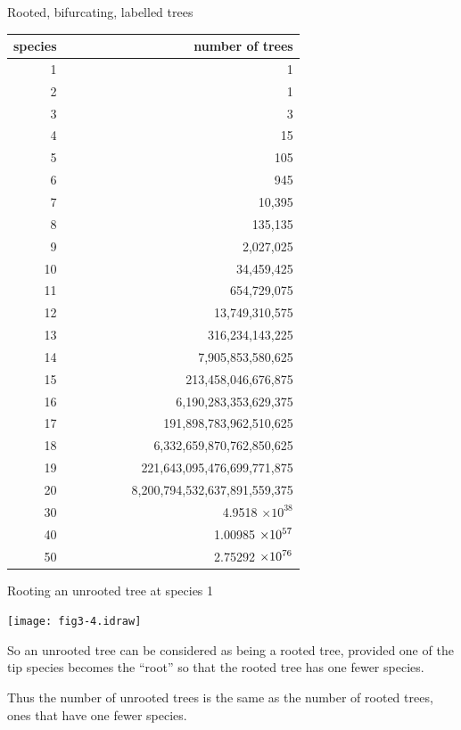 \documentclass[bluish,slideColor,colorBG,pdf]{prosper}
\begin{document}
\begin{slide}[Replace]{Rooted, bifurcating, labelled trees}

\vspace{-0.1in}

{
\begin{center}
\renewcommand{\arraystretch}{0.85}
\begin{tabular}{r r}
species & number of trees \\
\hline
1 & 1 \\
2 & 1 \\
3 & 3 \\
4 & 15 \\
5 & 105 \\
6 & 945 \\
7 & 10,395 \\
8 & 135,135 \\
9 & 2,027,025 \\
10 & 34,459,425 \\
11 & 654,729,075\\
12 & 13,749,310,575\\
13 & 316,234,143,225\\
14 & 7,905,853,580,625\\
15 & 213,458,046,676,875\\
16 & 6,190,283,353,629,375\\
17 & 191,898,783,962,510,625\\
18 & 6,332,659,870,762,850,625\\
19 & 221,643,095,476,699,771,875\\
20 & \ \ \ \ \ \ \ \ \ \ 8,200,794,532,637,891,559,375\\
30 & 4.9518 $\times 10^{38}$\\
40 & 1.00985 $\times {\rm 10}^{57}$\\
50 & 2.75292 $\times {\rm 10}^{76}$\\
\end{tabular}
\end{center}
}

\end{slide}

\begin{slide}[Replace]{Rooting an unrooted tree at species 1}

\centerline{\texttt{[image: fig3-4.idraw]}}
\bigskip

So an unrooted tree can be considered as being a rooted
tree, provided one of the tip species becomes the ``root'' so
that the rooted tree has one fewer species.
\bigskip

Thus the number of unrooted trees is the same as the number of rooted
trees, ones that have one fewer species.

\end{slide}
\end{document}
